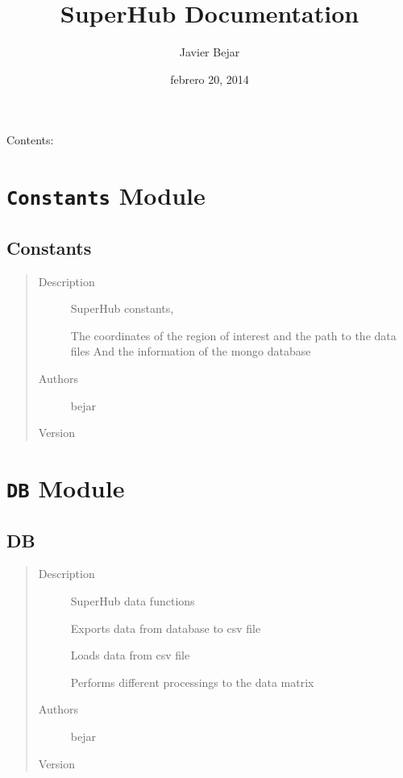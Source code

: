 \documentclass[letterpaper,10pt,english]{sphinxmanual}
\title{SuperHub Documentation}
\date{febrero 20, 2014}
\author{Javier Bejar}
\begin{document}
\maketitle
\tableofcontents
{}\label{index::doc}


Contents:


\chapter{\texttt{Constants} Module}
\label{index:constants-module}\label{index:welcome-to-superhub-s-documentation}\label{index:module-SuperHub.Constants}\label{index:module-SuperHubConstants}

\section{Constants}
\label{index:constants}\begin{quote}\begin{description}
\item[{Description}] \leavevmode
SuperHub constants,

The coordinates of the region of interest and the path to the data files
And the information of the mongo database

\item[{Authors}] \leavevmode
bejar

\item[{Version}] 

\end{description}\end{quote}


\chapter{\texttt{DB} Module}
\label{index:module-SuperHub.DB}\label{index:db-module}\label{index:module-DB}

\section{DB}
\label{index:db}\begin{quote}\begin{description}
\item[{Description}] \leavevmode
SuperHub data functions

Exports data from database to csv file

Loads data from csv file

Performs different processings to the data matrix

\item[{Authors}] \leavevmode
bejar

\item[{Version}] 

\end{description}\end{quote}
\end{document}
